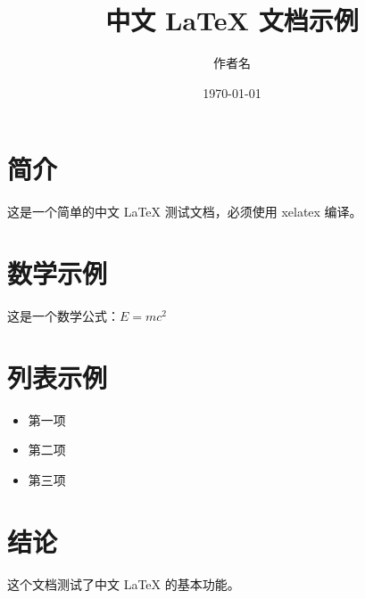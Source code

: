 \documentclass[UTF8]{article}
\title{中文 LaTeX 文档示例}
\author{作者名}
\date{\today}
\begin{document}
\maketitle

\section{简介}
这是一个简单的中文 LaTeX 测试文档，必须使用 xelatex 编译。

\section{数学示例}
这是一个数学公式：$E = mc^2$

\section{列表示例}
\begin{itemize}
\item 第一项
\item 第二项
\item 第三项
\end{itemize}

\section{结论}
这个文档测试了中文 LaTeX 的基本功能。
\end{document}
